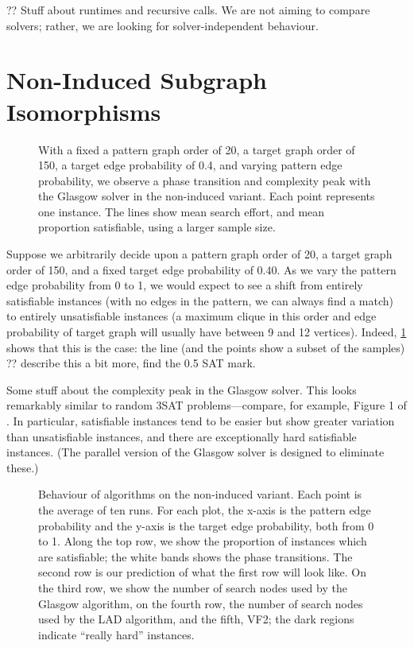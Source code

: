 \documentclass[letterpaper]{article}
\begin{document}
?? Stuff about runtimes and recursive calls. We are not aiming to compare solvers; rather, we are
looking for solver-independent behaviour.

\section{Non-Induced Subgraph Isomorphisms}

\begin{figure}[tb]
    
    \caption{With a fixed a pattern graph order of 20, a target graph order of 150, a target edge
        probability of 0.4, and varying pattern edge probability, we observe a phase transition and
        complexity peak with the Glasgow solver in the non-induced variant. Each point represents
        one instance. The lines show mean search effort, and mean proportion satisfiable, using a
    larger sample size.}
    \label{figure:phase-transition}
\end{figure}

Suppose we arbitrarily decide upon a pattern graph order of 20, a target graph order of 150, and a
fixed target edge probability of 0.40. As we vary the pattern edge probability from 0 to 1, we would
expect to see a shift from entirely satisfiable instances (with no edges in the pattern, we can
always find a match) to entirely unsatisfiable instances (a maximum clique in this order and edge
probability of target graph will usually have between 9 and 12 vertices). Indeed,
\cref{figure:phase-transition} shows that this is the case: the line (and the points show a subset
of the samples) ?? describe this a bit more, find the 0.5 SAT mark.

Some stuff about the complexity peak in the Glasgow solver. This looks remarkably similar to random
3SAT problems---compare, for example, Figure 1 of \citet{LeytonBrown:2014}. In particular,
satisfiable instances tend to be easier but show greater variation than unsatisfiable instances, and
there are exceptionally hard satisfiable instances. (The parallel version of the Glasgow solver is
designed to eliminate these.)

\begin{figure}[tb]
    
    \caption{Behaviour of algorithms on the non-induced variant. Each point is the average of ten
        runs. For each plot, the x-axis is the pattern edge probability and the y-axis is the target
        edge probability, both from 0 to 1. Along the top row, we show the proportion of instances which are
        satisfiable; the white bands shows the phase transitions. The second row is our prediction
        of what the first row will look like. On the third row, we show the number of search nodes
        used by the Glasgow algorithm, on the fourth row, the number of search nodes used by the LAD
        algorithm, and the fifth, VF2; the dark regions indicate ``really hard'' instances.}
    \label{figure:non-induced}
\end{figure}
\end{document}
